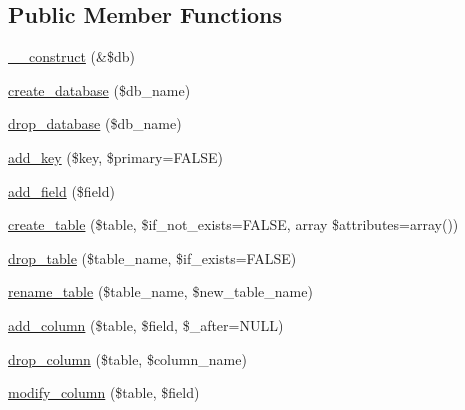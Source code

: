 \subsection*{Public Member Functions}
\begin{DoxyCompactItemize}
\item 
\mbox{\hyperlink{class_c_i___d_b__forge_ac695fbde23d492c944b4306e8733f98c}{\+\_\+\+\_\+construct}} (\&\$db)
\item 
\mbox{\hyperlink{class_c_i___d_b__forge_adb768758b1921eefceaf706573f40bae}{create\+\_\+database}} (\$db\+\_\+name)
\item 
\mbox{\hyperlink{class_c_i___d_b__forge_a2d091daaf5f4993de6958a5121328488}{drop\+\_\+database}} (\$db\+\_\+name)
\item 
\mbox{\hyperlink{class_c_i___d_b__forge_adbb8cda1e0d972075ffdbd7f44ca78fb}{add\+\_\+key}} (\$key, \$primary=F\+A\+L\+SE)
\item 
\mbox{\hyperlink{class_c_i___d_b__forge_a35fb6832b60216461db6850ee20c326b}{add\+\_\+field}} (\$field)
\item 
\mbox{\hyperlink{class_c_i___d_b__forge_ae0229c764e5dca828471e63c97dc6509}{create\+\_\+table}} (\$table, \$if\+\_\+not\+\_\+exists=F\+A\+L\+SE, array \$attributes=array())
\item 
\mbox{\hyperlink{class_c_i___d_b__forge_a2e8e328bfb365fde6b13f6520662d13e}{drop\+\_\+table}} (\$table\+\_\+name, \$if\+\_\+exists=F\+A\+L\+SE)
\item 
\mbox{\hyperlink{class_c_i___d_b__forge_af615553dd5a0b09ee98a4ebdc20d0689}{rename\+\_\+table}} (\$table\+\_\+name, \$new\+\_\+table\+\_\+name)
\item 
\mbox{\hyperlink{class_c_i___d_b__forge_ab1e66284ed82eb6ee154194d14bdd18c}{add\+\_\+column}} (\$table, \$field, \$\+\_\+after=N\+U\+LL)
\item 
\mbox{\hyperlink{class_c_i___d_b__forge_a91049c17e13e7e222a9c1415ff650321}{drop\+\_\+column}} (\$table, \$column\+\_\+name)
\item 
\mbox{\hyperlink{class_c_i___d_b__forge_a6af354e16fc2ed6ea6c41f7f64b0efcb}{modify\+\_\+column}} (\$table, \$field)
\end{DoxyCompactItemize}
